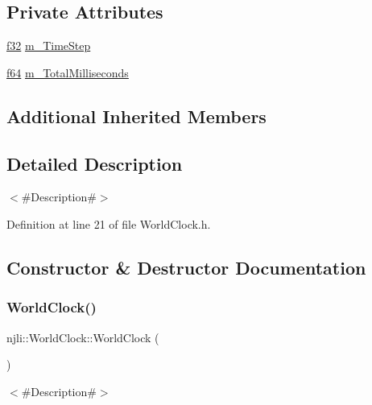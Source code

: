 \subsection*{Private Attributes}
\begin{DoxyCompactItemize}
\item 
\mbox{\hyperlink{_util_8h_a5f6906312a689f27d70e9d086649d3fd}{f32}} \mbox{\hyperlink{classnjli_1_1_world_clock_aa727682fd2ee70cbfba4e78813e8f730}{m\+\_\+\+Time\+Step}}
\item 
\mbox{\hyperlink{_util_8h_a94dab5770726ccbef8c7d026cfbdf8e5}{f64}} \mbox{\hyperlink{classnjli_1_1_world_clock_a2fccbd5a2216651b2614cf5b0d960046}{m\+\_\+\+Total\+Milliseconds}}
\end{DoxyCompactItemize}
\subsection*{Additional Inherited Members}


\subsection{Detailed Description}
$<$\#\+Description\#$>$ 

Definition at line 21 of file World\+Clock.\+h.



\subsection{Constructor \& Destructor Documentation}
\mbox{\label{classnjli_1_1_world_clock_abc95e23fc5d9c28884e4775c2c61e232}} 
\subsubsection{\texorpdfstring{World\+Clock()}{WorldClock()}\hspace{0.1cm}{\footnotesize\ttfamily [1/2]}}
{\footnotesize\ttfamily njli\+::\+World\+Clock\+::\+World\+Clock (\begin{DoxyParamCaption}{ }\end{DoxyParamCaption})}

$<$\#\+Description\#$>$ \mbox{\label{classnjli_1_1_world_clock_aac4a9a1501e69c88ef720b01564c9d4c}} 
